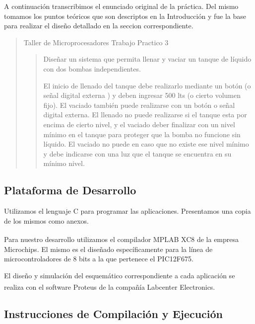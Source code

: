 \documentclass[a4paper]{article}
\let\originalcite\cite
\renewcommand{\cite}[2][]{\textsuperscript{\originalcite{#2}}}
\begin{document}
A continuación transcribimos el enunciado original de la práctica.
Del mismo tomamos los puntos teóricos que son descriptos en la 
Introducción y fue la base para realizar el diseño detallado en la seccion correspondiente.

\begin{quotation}

    \begin{center}
        
        Taller de Microprocesadores Trabajo Practico  3                

    \end{center}
    \begin{abstract}
    Diseñar un sistema que permita llenar y vaciar un tanque de líquido con dos bombas independientes. 

    El inicio de llenado del tanque debe realizarlo mediante un botón (o señal digital externa ) y deben ingresar 500 lts (o cierto volumen fijo). El vaciado también puede realizarse con un botón o señal digital externa. El llenado no puede realizarse si el tanque esta por encima de cierto nivel, y el vaciado deber finalizar con un nivel mínimo en el tanque para proteger que la bomba no funcione sin líquido. El vaciado no puede en caso que no existe ese nivel mínimo y debe indicarse con una luz que el tanque se encuentra en su mínimo nivel.
    \end{abstract}
\end{quotation}

\subsection{Plataforma de Desarrollo}

Utilizamos el lenguaje C para programar las aplicaciones. Presentamos
una copia de los mismos como anexos.

Para nuestro desarrollo utilizamos el compilador MPLAB 
XC8\cite{bib:compilador} de la empresa Microchips. El mismo es el 
diseñado específicamente para la línea de microcontroladores de 8 bits
a la que pertenece el PIC12F675.

El diseño y simulación del esquemático correspondiente a cada 
aplicación se realiza con el software Proteus\cite{bib:simulador} de 
la compañía Labcenter Electronics.

\subsection{Instrucciones de Compilación y Ejecución}
\end{document}
